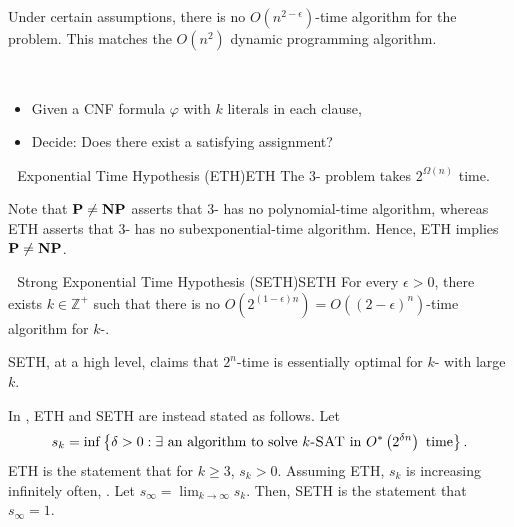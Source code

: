         \begin{example}
            Under certain assumptions, there is no \(O(n^{2-\epsilon})\)-time algorithm for the  problem. This matches the \(O(n^2)\) dynamic programming algorithm.
        \end{example}
        \pagebreak
        \begin{compprob} \label{prob:ksat}
            \vphantom
            \\
            \begin{itemize}
                \item Given a CNF formula \(\varphi\) with \(k\) literals in each clause,
                \item Decide: Does there exist a satisfying assignment?
            \end{itemize}
        \end{compprob}
        \begin{hypothesis}{\Stop\,\,\cite{impagliazzo2001ksatcomplexity} Exponential Time Hypothesis (ETH)}{ETH}
            The \(3\)- problem takes \(2^{\Omega(n)}\) time.
        \end{hypothesis}
        \begin{remark*}
            Note that \(\mathbf{P}\neq\mathbf{NP}\) asserts that \(3\)- has no polynomial-time algorithm, whereas ETH asserts that \(3\)- has no subexponential-time algorithm. Hence, ETH implies \(\mathbf{P}\neq\mathbf{NP}\).
        \end{remark*}
        \begin{hypothesis}{\Stop\,\,\cite{impagliazzo2001ksatcomplexity,impagliazzo2001stronglyexp} Strong Exponential Time Hypothesis (SETH)}{SETH}
            For every \(\epsilon>0\), there exists \(k\in\mathbb{Z}^+\) such that there is no \(O\left(2^{(1-\epsilon)n}\right)=O((2-\epsilon)^n)\)-time algorithm for \(k\)-.
        \end{hypothesis}
        \begin{remark*}
            SETH, at a high level, claims that \(2^n\)-time is essentially optimal for \(k\)- with large \(k\).
        \end{remark*}
        \begin{remark*}
            In \cite{impagliazzo2001ksatcomplexity,impagliazzo2001stronglyexp}, ETH and SETH are instead stated as follows. Let
            \begin{equation*}
            s_k=\inf\left\{\delta>0: \exists \text{ an algorithm to solve }k\textsc{-SAT}\text{ in }O^*\left(2^{\delta n}\right)\text{ time}\right\}.
            \end{equation*}
            ETH is the statement that for \(k\geq3\), \(s_k>0\). Assuming ETH, \(s_k\) is increasing infinitely often, \cite{impagliazzo2001stronglyexp}. Let \(s_\infty=\lim_{k\to\infty} s_k\). Then, SETH is the statement that \(s_\infty=1\).
        \end{remark*}
